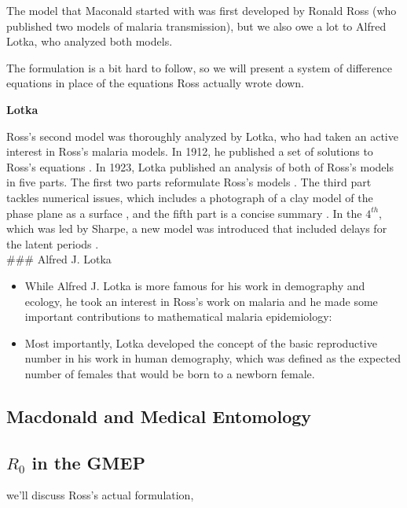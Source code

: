\documentclass[
]{book}
\begin{document}
The model that Maconald started with was first developed by
Ronald Ross (who published two models of malaria transmission), but we also owe a lot to Alfred Lotka, who analyzed both models.

The formulation is a bit hard to follow, so we will present a system of difference equations in place of the equations Ross actually wrote down.

\textbf{Lotka}

Ross's second model was thoroughly analyzed by Lotka, who had taken an active interest in Ross's malaria models. In 1912, he published a set of solutions to Ross's equations \autocite{LotkaAJ1912Nature}. In 1923, Lotka published an analysis of both of Ross's models in five parts. The first two parts reformulate Ross's models \autocite{LotkaAJ1923part1,LotkaAJ1923part2}. The third part tackles numerical issues, which includes a photograph of a clay model of the phase plane as a surface \autocite{LotkaAJ1923part3}, and the fifth part is a concise summary \autocite{LotkaAJ1923part5}. In the \(4^{th}\), which was led by Sharpe, a new model was introduced that included delays for the latent periods \autocite{LotkaAJ1923part4}.\\
\#\#\# Alfred J. Lotka

\begin{itemize}
\item
  While Alfred J. Lotka is more famous for his work in demography and ecology, he took an interest in Ross's work on malaria and he made some important contributions to mathematical malaria epidemiology:
\item
  Most importantly, Lotka developed the concept of the basic reproductive number in his work in human demography, which was defined as the expected number of females that would be born to a newborn female.
\end{itemize}

\subsection{Macdonald and Medical Entomology}\label{macdonald-and-medical-entomology}

\subsection{\texorpdfstring{\(R_0\) in the GMEP}{R\_0 in the GMEP}}\label{r_0-in-the-gmep}

we'll discuss Ross's actual formulation,
\end{document}

